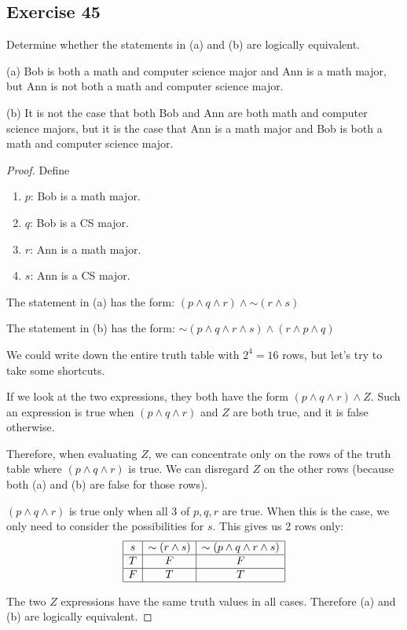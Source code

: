 \documentclass[14pt]{extarticle}
\begin{document}
\subsection{Exercise 45}
Determine whether the statements in (a) and (b) are logically equivalent.

(a) Bob is both a math and computer science major and Ann is a math major, but Ann is not both a math and computer science major.

(b) It is not the case that both Bob and Ann are both math and computer science majors, but it is the case that Ann is a math major and Bob is both a math and computer science major.

\begin{proof} Define
    \begin{enumerate}
        \item $p$: Bob is a math major.
        \item $q$: Bob is a CS major.
        \item $r$: Ann is a math major.
        \item $s$: Ann is a CS major.
    \end{enumerate}

    The statement in (a) has the form: $(p \wedge q \wedge r) \wedge {\sim (r \wedge s)}$

    The statement in (b) has the form: ${\sim (p \wedge q \wedge r \wedge s)} \wedge (r \wedge p \wedge q)$

    We could write down the entire truth table with $2^4 = 16$ rows, but let's try to take some shortcuts.

    If we look at the two expressions, they both have the form $(p \wedge q \wedge r) \wedge Z$. Such an expression is true when $(p \wedge q \wedge r)$ and $Z$ are both true, and it is false otherwise.

    Therefore, when evaluating $Z$, we can concentrate only on the rows of the truth table where $(p \wedge q \wedge r)$ is true. We can disregard $Z$ on the other rows (because both (a) and (b) are false for those rows).

    $(p \wedge q \wedge r)$ is true only when all 3 of $p, q, r$ are true. When this is the case, we only need to consider the possibilities for $s$. This gives us 2 rows only:
    $$
        \begin{array}{|c|c|c|}
            \hline
            s & {\sim (r \wedge s)} & {\sim (p \wedge q \wedge r \wedge s)} \\
            \hline
            T & F                   & F                                     \\
            \hline
            F & T                   & T                                     \\
            \hline
        \end{array}
    $$

    The two $Z$ expressions have the same truth values in all cases. Therefore (a) and (b) are logically equivalent.
\end{proof}
\end{document}
